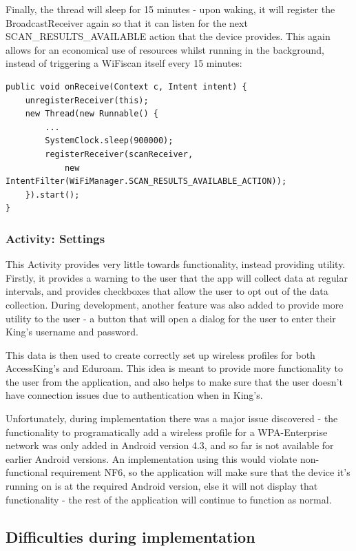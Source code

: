 \documentclass[11pt]{informatics-report}
\begin{document}
Finally, the thread will sleep for 15 minutes - upon waking, it will register the BroadcastReceiver again so that it can listen for the next SCAN\_RESULTS\_AVAILABLE action that the device provides. This again allows for an economical use of resources whilst running in the background, instead of triggering a WiFiscan itself every 15 minutes:


\begin{verbatim}
public void onReceive(Context c, Intent intent) {
	unregisterReceiver(this);
	new Thread(new Runnable() {
		...
		SystemClock.sleep(900000);
		registerReceiver(scanReceiver, 
			new IntentFilter(WiFiManager.SCAN_RESULTS_AVAILABLE_ACTION));
	}).start();
}

\end{verbatim}

\subsubsection{Activity: Settings}

This Activity provides very little towards functionality, instead providing utility. Firstly, it provides a warning to the user that the app will collect data at regular intervals, and provides checkboxes that allow the user to opt out of the data collection. During development, another feature was also added to provide more utility to the user - a button that will open a dialog for the user to enter their King's username and password.

This data is then used to create correctly set up wireless profiles for both AccessKing's and Eduroam. This idea is meant to provide more functionality to the user from the application, and also helps to make sure that the user doesn't have connection issues due to authentication when in King's.

Unfortunately, during implementation there was a major issue discovered - the functionality to programatically add a wireless profile for a WPA-Enterprise network was only added in Android version 4.3, and so far is not available for earlier Android versions. An implementation using this would violate non-functional requirement NF6, so the application will make sure that the device it's running on is at the required Android version, else it will not display that functionality - the rest of the application will continue to function as normal.

\subsection{Difficulties during implementation}
\end{document}
